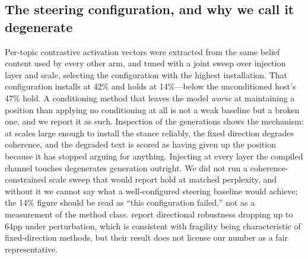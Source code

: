\subsection{The steering configuration, and why we call it degenerate}
\label{app:steering}
Per-topic contrastive activation vectors were extracted from the same belief content used by
every other arm, and tuned with a joint sweep over injection layer and scale, selecting the
configuration with the highest installation. That configuration installs at 42\% and holds at
14\%---below the unconditioned host's 47\% hold. A conditioning method that leaves the model
\emph{worse} at maintaining a position than applying no conditioning at all is not a weak
baseline but a broken one, and we report it as such. Inspection of the generations shows the
mechanism: at scales large enough to install the stance reliably, the fixed direction degrades
coherence, and the degraded text is scored as having given up the position because it has
stopped arguing for anything. Injecting at every layer the compiled channel touches degenerates
generation outright. We did not run a coherence-constrained scale sweep that would report hold
at matched perplexity, and without it we cannot say what a well-configured steering baseline
would achieve; the 14\% figure should be read as ``this configuration failed,'' not as a
measurement of the method class. \citet{le2026steeringrobustness} report directional robustness
dropping up to 64pp under perturbation, which is consistent with fragility being characteristic
of fixed-direction methods, but their result does not license our number as a fair
representative.

